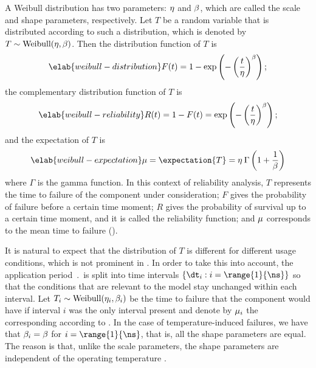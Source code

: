 A Weibull distribution has two parameters: $\eta$ and $\beta$, which are
called the scale and shape parameters, respectively. Let $T$ be a random
variable that is distributed according to such a distribution, which is denoted
by $T \sim \mathrm{Weibull}(\eta, \beta)$. Then the distribution function
\cite{durrett2010} of $T$ is
\begin{equation} \elab{weibull-distribution}
  F(t) = 1 - \exp\left(-\left(\frac{t}{\scale}\right)^\shape\right);
\end{equation}
the complementary distribution function of $T$ is
\begin{equation} \elab{weibull-reliability}
  R(t) = 1 - F(t) = \exp\left(-\left(\frac{t}{\scale}\right)^\shape\right);
\end{equation}
and the expectation of $T$ is
\begin{equation} \elab{weibull-expectation}
  \mean = \expectation{T} = \scale \: \Gamma\left(1 + \frac{1}{\shape}\right)
\end{equation}
where $\Gamma$ is the gamma function. In this context of reliability analysis,
$T$ represents the time to failure of the component under consideration; $F$
gives the probability of failure before a certain time moment; $R$ gives the
probability of survival up to a certain time moment, and it is called the
reliability function; and $\mu$ corresponds to the mean time to failure
().

It is natural to expect that the distribution of $T$ is different for different
usage conditions, which is not prominent in . In
order to take this into account, the application period $\period$ is split into
\ns time intervals $\{ \dt_i: i = \range{1}{\ns} \}$ so that the conditions that
are relevant to the model stay unchanged within each interval. Let $T_i \sim
\mathrm{Weibull}(\eta_i, \beta_i)$ be the time to failure that the component
would have if interval $i$ was the only interval present and denote by $\mu_i$
the corresponding  according to . In the case
of temperature-induced failures, we have that $\beta_i = \beta$ for $i =
\range{1}{\ns}$, that is, all the shape parameters are equal. The reason is
that, unlike the scale parameters, the shape parameters are independent of the
operating temperature \cite{chang2006}.

